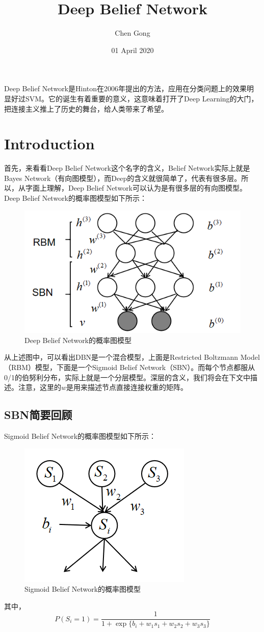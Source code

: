 \documentclass[a4paper]{article}
\title{Deep Belief Network}
\author{Chen Gong}
\date{01 April 2020}
\begin{document}
\maketitle
\tableofcontents
\newpage
\setcounter{page}{1} %
\clearpage

Deep Belief Network是Hinton在2006年提出的方法，应用在分类问题上的效果明显好过SVM。它的诞生有着重要的意义，这意味着打开了Deep Learning的大门，把连接主义推上了历史的舞台，给人类带来了希望。
\section{Introduction}
首先，来看看Deep Belief Network这个名字的含义，Belief Network实际上就是Bayes Network（有向图模型），而Deep的含义就很简单了，代表有很多层。所以，从字面上理解，Deep Belief Network可以认为是有很多层的有向图模型。Deep Belief Network的概率图模型如下所示：
\begin{figure}[H]
    \centering
    \includegraphics[width=.55\textwidth]{微信图片_20200407114236.png}
    \caption{Deep Belief Network的概率图模型}
    \label{fig:my_label_1}
\end{figure}
从上述图中，可以看出DBN是一个混合模型，上面是Restricted Boltzmann Model（RBM）模型，下面是一个Sigmoid Belief Network（SBN）。而每个节点都服从0/1的伯努利分布，实际上就是一个分层模型。深层的含义，我们将会在下文中描述。注意，这里的$w$是用来描述节点直接连接权重的矩阵。
\subsection{SBN简要回顾}
Sigmoid Belief Network的概率图模型如下所示：
\begin{figure}[H]
    \centering
    \includegraphics[width=.3\textwidth]{微信图片_20200407120853.png}
    \caption{Sigmoid Belief Network的概率图模型}
    \label{fig:my_label_1}
\end{figure}
其中，
\begin{equation}
    P(S_i=1) = \frac{1}{ 1 + \exp\{ b_i + w_1s_1 + w_2s_2 + w_3s_3 \}}
\end{equation}
\end{document}
